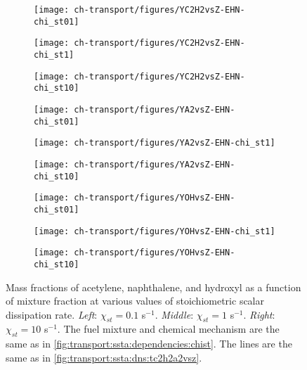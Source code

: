 \begin{figure}[ht]
  \centering
  \begin{subfigure}[b]{0.33\linewidth}
    \centering
    \texttt{[image: ch-transport/figures/YC2H2vsZ-EHN-chi\_st01]}
  \end{subfigure}%
  \begin{subfigure}[b]{0.33\linewidth}
    \centering
    \texttt{[image: ch-transport/figures/YC2H2vsZ-EHN-chi\_st1]}
  \end{subfigure}%
  \begin{subfigure}[b]{0.33\linewidth}
    \centering
    \texttt{[image: ch-transport/figures/YC2H2vsZ-EHN-chi\_st10]}
  \end{subfigure}
  \begin{subfigure}[b]{0.33\linewidth}
    \centering
    \texttt{[image: ch-transport/figures/YA2vsZ-EHN-chi\_st01]}
  \end{subfigure}%
  \begin{subfigure}[b]{0.33\linewidth}
    \centering
    \texttt{[image: ch-transport/figures/YA2vsZ-EHN-chi\_st1]}
  \end{subfigure}%
  \begin{subfigure}[b]{0.33\linewidth}
    \centering
    \texttt{[image: ch-transport/figures/YA2vsZ-EHN-chi\_st10]}
  \end{subfigure}
  \begin{subfigure}[b]{0.33\linewidth}
    \centering
    \texttt{[image: ch-transport/figures/YOHvsZ-EHN-chi\_st01]}
  \end{subfigure}%
  \begin{subfigure}[b]{0.33\linewidth}
    \centering
    \texttt{[image: ch-transport/figures/YOHvsZ-EHN-chi\_st1]}
  \end{subfigure}%
  \begin{subfigure}[b]{0.33\linewidth}
    \centering
    \texttt{[image: ch-transport/figures/YOHvsZ-EHN-chi\_st10]}
  \end{subfigure}
  \caption[Trends of $Y_{\ce{C2H2}}$, $Y_{\text{A2}}$, and $Y_{\ce{OH}}$ with $\chi_{st}$]{Mass fractions of acetylene, naphthalene, and hydroxyl as a function of mixture fraction at various values of stoichiometric scalar dissipation rate. \textit{Left}: $\chi_{st} = 0.1$ s$^{-1}$. \textit{Middle}: $\chi_{st} = 1$ s$^{-1}$. \textit{Right}: $\chi_{st} = 10$ s$^{-1}$. The fuel mixture and chemical mechanism are the same as in \cref{fig:transport:ssta:dependencies:chist}. The lines are the same as in \cref{fig:transport:ssta:dns:tc2h2a2vsz}.}
  \label{fig:transport:ssta:dependencies:c2h2a2vschist}
\end{figure}

